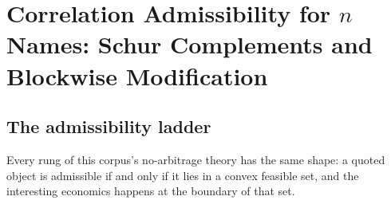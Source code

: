 
\chapter{Correlation Admissibility for $n$ Names: Schur Complements and Blockwise Modification}
\label{ch:admiss}

\section{The admissibility ladder}\label{sec:admiss:ladder}

Every rung of this corpus's no-arbitrage theory has the same shape: a quoted
object is admissible if and only if it lies in a convex feasible set, and the
interesting economics happens at the boundary of that set.

